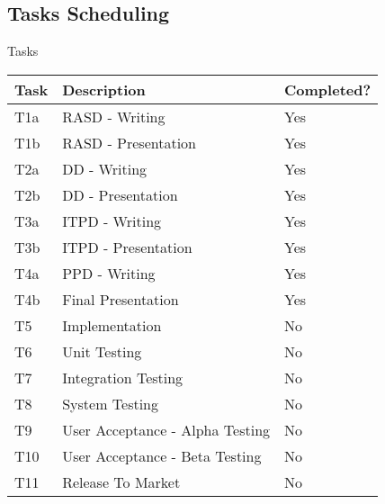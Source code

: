 \documentclass{../common/latex_classes/pdf_presentation}
\begin{document}
	\subsection{Tasks Scheduling}
	\begin{frame}{Tasks}
		\begin{tabulary}{\linewidth\tymin=70pt}{Y{2cm}|Y{6cm}|Y{2.25cm}}
			\textbf{Task} & \textbf{Description} & \textbf{Completed?}\\ \hline
			T1a & RASD - Writing & Yes \\ \hline
			T1b & RASD - Presentation & Yes \\ \hline
			T2a & DD - Writing & Yes \\ \hline
			T2b & DD - Presentation & Yes \\ \hline
			T3a & ITPD - Writing & Yes \\ \hline
			T3b & ITPD - Presentation & Yes \\ \hline
			T4a & PPD - Writing & Yes \\ \hline
			T4b & Final Presentation & Yes \\ \hline
			T5 & Implementation & No \\ \hline
			T6 & Unit Testing & No \\ \hline
			T7 & Integration Testing & No \\ \hline
			T8 & System Testing & No \\ \hline
			T9 & User Acceptance - Alpha Testing & No \\ \hline
			T10 & User Acceptance - Beta Testing & No \\ \hline
			T11 & Release To Market & No \\
		\end{tabulary}
	\end{frame}
\end{document}
